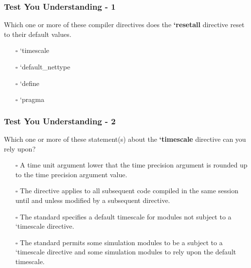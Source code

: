 \documentclass[t, notes, xcolor=table]{beamer}
\begin{document}
\begin{frame}
\frametitle{Test You Understanding - 1}
Which one or more of these compiler directives does the \textbf{`resetall} directive reset to their default values.
\begin{itemize}
\item[$\square$] `timescale
\item[$\square$] `default\_nettype
\item[$\square$] `define
\item[$\square$] `pragma
\end{itemize}
\end{frame}

\begin{frame}
\frametitle{Test You Understanding - 2}
Which one or more of these statement(s) about the \textbf{`timescale} directive can you rely upon?
\begin{itemize}
\item[$\square$] A time unit argument lower that the time precision argument is rounded up to the time precision argument value.
\item[$\square$] The directive applies to all subsequent code compiled in the same session until and unless modified by a subsequent directive.
\item[$\square$] The standard specifies a default timescale for modules not subject to a `timescale directive.
\item[$\square$] The standard permits some simulation modules to be a subject to a `timescale directive and some simulation modules to rely upon the default timescale.
\end{itemize}
\end{frame}
\end{document}
